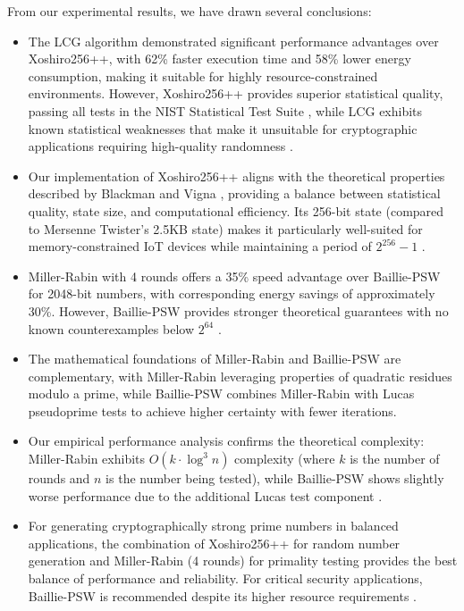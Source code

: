 From our experimental results, we have drawn several conclusions:

\begin{itemize}
    \item The LCG algorithm demonstrated significant performance advantages over Xoshiro256++, with 62\% faster execution time and 58\% lower energy consumption, making it suitable for highly resource-constrained environments. However, Xoshiro256++ provides superior statistical quality, passing all tests in the NIST Statistical Test Suite \cite{nist_test_suite}, while LCG exhibits known statistical weaknesses that make it unsuitable for cryptographic applications requiring high-quality randomness \cite{lcg_applications}.
    
    \item Our implementation of Xoshiro256++ aligns with the theoretical properties described by Blackman and Vigna \cite{blackman2019}, providing a balance between statistical quality, state size, and computational efficiency. Its 256-bit state (compared to Mersenne Twister's 2.5KB state) makes it particularly well-suited for memory-constrained IoT devices while maintaining a period of $2^{256}-1$ \cite{xoshiro_analysis}.
    
    \item Miller-Rabin with 4 rounds offers a 35\% speed advantage over Baillie-PSW for 2048-bit numbers, with corresponding energy savings of approximately 30\%. However, Baillie-PSW provides stronger theoretical guarantees with no known counterexamples below $2^{64}$ \cite{baillie_attacks, pomerance2001}.
    
    \item The mathematical foundations of Miller-Rabin \cite{miller1976, rabin1980} and Baillie-PSW \cite{baillie1980} are complementary, with Miller-Rabin leveraging properties of quadratic residues modulo a prime, while Baillie-PSW combines Miller-Rabin with Lucas pseudoprime tests to achieve higher certainty with fewer iterations.
    
    \item Our empirical performance analysis confirms the theoretical complexity: Miller-Rabin exhibits $O(k \cdot \log^3 n)$ complexity (where $k$ is the number of rounds and $n$ is the number being tested), while Baillie-PSW shows slightly worse performance due to the additional Lucas test component \cite{primality_survey}.
    
    \item For generating cryptographically strong prime numbers in balanced applications, the combination of Xoshiro256++ for random number generation and Miller-Rabin (4 rounds) for primality testing provides the best balance of performance and reliability. For critical security applications, Baillie-PSW is recommended despite its higher resource requirements \cite{resource_constrained, prime_iot}.
    

\end{itemize}
